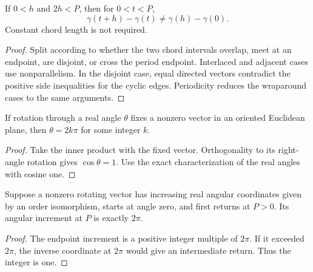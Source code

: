 \begin{lemma}
\label{lem:chord-nonreturn}
\leanok
{}
If $0<h$ and $2h<P$, then for $0<t<P$,
\[
 \gamma(t+h)-\gamma(t)\ne\gamma(h)-\gamma(0).
\]
Constant chord length is not required.
\end{lemma}
\begin{proof}
\leanok
Split according to whether the two chord intervals overlap, meet at an
endpoint, are disjoint, or cross the period endpoint. Interlaced and
adjacent cases use nonparallelism. In the disjoint case, equal directed
vectors contradict the positive side inequalities for the cyclic edges.
Periodicity reduces the wraparound cases to the same arguments.
\end{proof}

\begin{lemma}
\label{lem:rotation-integer-turns}
\leanok
If rotation through a real angle $\theta$ fixes a nonzero vector in an
oriented Euclidean plane, then $\theta=2k\pi$ for some integer $k$.
\end{lemma}
\begin{proof}
\leanok
Take the inner product with the fixed vector. Orthogonality to its
right-angle rotation gives $\cos\theta=1$. Use the exact characterization
of the real angles with cosine one.
\end{proof}

\begin{lemma}
\label{lem:angle-first-return}
\leanok
{}
Suppose a nonzero rotating vector has increasing real angular coordinates
given by an order isomorphism, starts at angle zero, and first returns at
$P>0$. Its angular increment at $P$ is exactly $2\pi$.
\end{lemma}
\begin{proof}
\leanok
The endpoint increment is a positive integer multiple of $2\pi$.
If it exceeded $2\pi$, the inverse coordinate at $2\pi$ would give an
intermediate return. Thus the integer is one.
\end{proof}

